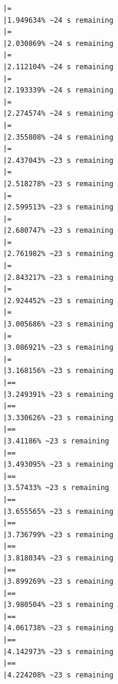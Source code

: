 \documentclass{article}\usepackage[]{graphicx}\usepackage[]{xcolor}
\makeatletter
\newenvironment{kframe}{%
 \def\at@end@of@kframe{}%
 \ifinner\ifhmode%
  \def\at@end@of@kframe{\end{minipage}}%
  \begin{minipage}{\columnwidth}%
 \fi\fi%
 \def\FrameCommand##1{\hskip\@totalleftmargin \hskip-\fboxsep
 \colorbox{shadecolor}{##1}\hskip-\fboxsep
     \hskip-\linewidth \hskip-\@totalleftmargin \hskip\columnwidth}%
 \MakeFramed {\advance\hsize-\width
   \@totalleftmargin\z@ \linewidth\hsize
   \@setminipage}}%
 {\par\unskip\endMakeFramed%
 \at@end@of@kframe}
\newenvironment{knitrout}{}{} %
\makeatother
\begin{document}
\begin{knitrout}
\begin{kframe}
\begin{verbatim}
|=                                                             |1.949634% ~24 s remaining 
|=                                                             |2.030869% ~24 s remaining 
|=                                                             |2.112104% ~24 s remaining 
|=                                                             |2.193339% ~24 s remaining 
|=                                                             |2.274574% ~24 s remaining 
|=                                                             |2.355808% ~24 s remaining 
|=                                                             |2.437043% ~23 s remaining 
|=                                                             |2.518278% ~23 s remaining 
|=                                                             |2.599513% ~23 s remaining 
|=                                                             |2.680747% ~23 s remaining 
|=                                                             |2.761982% ~23 s remaining 
|=                                                             |2.843217% ~23 s remaining 
|=                                                             |2.924452% ~23 s remaining 
|=                                                             |3.005686% ~23 s remaining 
|=                                                             |3.086921% ~23 s remaining 
|=                                                             |3.168156% ~23 s remaining 
|==                                                            |3.249391% ~23 s remaining 
|==                                                            |3.330626% ~23 s remaining 
|==                                                            |3.41186% ~23 s remaining  
|==                                                            |3.493095% ~23 s remaining 
|==                                                            |3.57433% ~23 s remaining  
|==                                                            |3.655565% ~23 s remaining 
|==                                                            |3.736799% ~23 s remaining 
|==                                                            |3.818034% ~23 s remaining 
|==                                                            |3.899269% ~23 s remaining 
|==                                                            |3.980504% ~23 s remaining 
|==                                                            |4.061738% ~23 s remaining 
|==                                                            |4.142973% ~23 s remaining 
|==                                                            |4.224208% ~23 s remaining 

\end{verbatim}
\end{kframe}
\end{knitrout}
\end{document}
